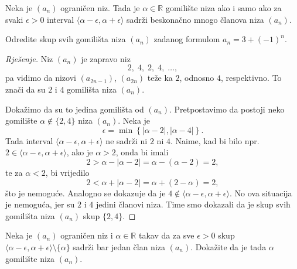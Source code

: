 \begin{remark} Neka je $(a_n)$ ograničen niz. Tada je $\alpha\in \mathbb{R}$ gomilište niza ako i samo ako za svaki $\epsilon>0$ interval $\langle \alpha-\epsilon, \alpha+\epsilon\rangle$ sadrži beskonačno mnogo članova niza $(a_n)$.
\end{remark}

\begin{exercise}
\label{limitpoints1}
Odredite skup svih gomilišta niza $(a_n)$ zadanog formulom $a_n=3+(-1)^n$.
\end{exercise}
\begin{proof}[Rješenje]
Niz $(a_n)$ je zapravo niz $$2,\; 4, \; 2,\; 4,\;\dots,$$ pa vidimo da nizovi $(a_{2n-1})$, $(a_{2n})$ teže ka $2$, odnosno $4$, respektivno. To znači da su $2$ i $4$ gomilišta niza $(a_n)$. 

Dokažimo da su to jedina gomilišta od $(a_n)$. Pretpostavimo da postoji neko gomilište $\alpha\notin \{2, 4\}$ niza $(a_n)$. Neka je $$\epsilon=\min\left\{|\alpha-2|,|\alpha-4|\right\}.$$ Tada interval $\langle\alpha-\epsilon, \alpha+\epsilon\rangle$ ne sadrži ni $2$ ni $4$. Naime, kad bi bilo npr. $2\in \langle\alpha-\epsilon, \alpha+\epsilon\rangle$, ako je $\alpha>2$, onda bi imali $$2>\alpha-|\alpha-2|=\alpha-(\alpha-2)=2,$$ te za $\alpha<2$, bi vrijedilo $$2<\alpha+|\alpha-2|=\alpha+(2-\alpha)=2,$$ 
što je nemoguće. Analogno se dokazuje da je $4\notin\langle\alpha-\epsilon, \alpha+\epsilon\rangle$. 
No ova situacija je nemoguća, jer su $2$ i $4$ jedini članovi niza. Time smo dokazali da je skup svih gomilišta niza $(a_n)$ skup $\{2, 4\}$.
\end{proof}
\begin{exercise}
\label{limitpoints3}
Neka je $(a_n)$ ograničen niz i $\alpha\in \mathbb{R}$ takav da za sve $\epsilon>0$ skup $\langle \alpha-\epsilon, \alpha+\epsilon\rangle\setminus \{\alpha\}$ sadrži bar jedan član niza $(a_n)$. Dokažite da je tada $\alpha$ gomilište niza $(a_n)$.
\end{exercise}
